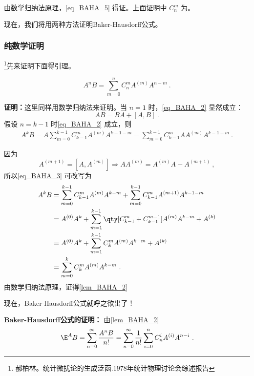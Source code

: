 由数学归纳法原理，\autoref{eq_BAHA_5} 得证。上面证明中 $C_n^m$ 为。

现在，我们将用两种方法证明Baker-Hausdorff公式。
\subsubsection{纯数学证明}
\footnote{郝柏林。统计微扰论的生成泛函.1978年统计物理讨论会综述报告}先来证明下面得引理。
\begin{lemma}{}\label{lem_BAHA_2}
\begin{equation}\label{eq_BAHA_2}
A^nB=\sum_{m=0}^{n}C_{n}^mA^{(m)}A^{n-m}~.
\end{equation}
\end{lemma}
\textbf{证明：}这里同样用数学归纳法来证明。当 $n=1$ 时，\autoref{eq_BAHA_2} 显然成立：
\begin{equation}
AB=BA+[A,B]~.
\end{equation}
假设 $n=k-1$ 时\autoref{eq_BAHA_2} 成立，则
\begin{equation}\label{eq_BAHA_3}
\begin{aligned}
A^{k}B=A\sum_{m=0}^{k-1}C_{k-1}^mA^{(m)}A^{k-1-m}=\sum_{m=0}^{k-1}C_{k-1}^mAA^{(m)}A^{k-1-m}~.
\end{aligned}
\end{equation}

因为
\begin{equation}
A^{(m+1)}=[A,A^{(m)}]\Rightarrow AA^{(m)}=A^{(m)}A+A^{(m+1)}~,
\end{equation}
所以\autoref{eq_BAHA_3} 可改写为
\begin{equation}
\begin{aligned}
A^k B&=\sum_{m=0}^{k-1}C_{k-1}^mA^{(m)}A^{k-m}+\sum_{m=0}^{k-1}C_{k-1}^mA^{(m+1)}A^{k-1-m}\\
&=A^{(0)}A^{k}+\sum_{m=1}^{k-1}\qty[C_{k-1}^m+C_{k-1}^{m-1}]A^{(m)}A^{k-m}+A^{(k)}\\
&=A^{(0)}A^{k}+\sum_{m=1}^{k-1}C_{k}^mA^{(m)}A^{k-m}+A^{(k)}\\
&=\sum_{m=0}^{k}C_{k}^mA^{(m)}A^{k-m}~.
\end{aligned}
\end{equation}
由数学归纳法原理，证得\autoref{lem_BAHA_2} 

现在，Baker-Hausdorff公式就呼之欲出了！

\textbf{Baker-Hausdorff公式的证明：}
由\autoref{lem_BAHA_2} 
\begin{equation}\label{eq_BAHA_4}
\E^A B=\sum_{n=0}^{\infty}\frac{A^nB}{n!}=\sum_{n=0}^{\infty}\frac{1}{n!}\sum_{i=0}^{n}C_{n}^iA^{(i)}A^{n-i}~.
\end{equation}

